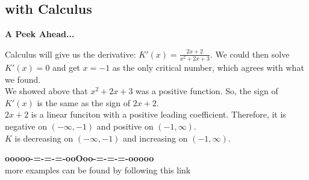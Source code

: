 \documentclass{ximera}
\begin{document}
\subsection*{with Calculus}

\textbf{\textcolor{red!70!black}{A Peek Ahead...}}


Calculus will give us the derivative: $K'(x) = \frac{2x+2}{x^2+2x+3}$.  We could then solve $K'(x) = 0$ and get $x=-1$ as the only critical number, which agrees with what we found. \\



We showed above that $x^2+2x+3$ was a positive function.  So, the sign of $K'(x)$ is the same as the sign of $2x+2$. \\

$2x+2$ is a linear funciton with a positive leading coefficient.  Therefore, it is negative on $(-\infty, -1)$  and positive on $(-1, \infty)$. \\


$K$ is decreasing on $(-\infty, -1)$ and increasing on $(-1, \infty)$.











\begin{center}
\textbf{\textcolor{green!50!black}{ooooo-=-=-=-ooOoo-=-=-=-ooooo}} \\

more examples can be found by following this link\\ 

\end{center}
\end{document}
